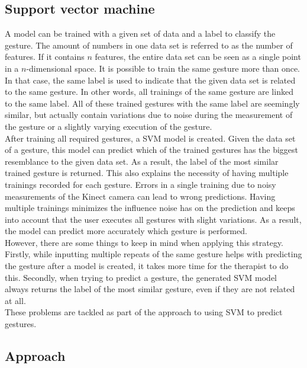 \subsection{Support vector machine}

A model can be trained with a given set of data and a label to classify the gesture. The amount of numbers in one data set is referred to as the number of features. If it contains $n$ features, the entire data set can be seen as a single point in a $n$-dimensional space. It is possible to train the same gesture more than once. In that case, the same label is used to indicate that the given data set is related to the same gesture. In other words, all trainings of the same gesture are linked to the same label. All of these trained gestures with the same label are seemingly similar, but actually contain variations due to noise during the measurement of the gesture or a slightly varying execution of the gesture.\\

After training all required gestures, a SVM model is created. Given the data set of a gesture, this model can predict which of the trained gestures has the biggest resemblance to the given data set. As a result, the label of the most similar trained gesture is returned. This also explains the necessity of having multiple trainings recorded for each gesture. Errors in a single training due to noisy measurements of the Kinect camera can lead to wrong predictions. Having multiple trainings minimizes the influence noise has on the prediction and keeps into account that the user executes all gestures with slight variations. As a result, the model can predict more accurately which gesture is performed.\\

However, there are some things to keep in mind when applying this strategy. Firstly, while inputting multiple repeats of the same gesture helps with predicting the gesture after a model is created, it takes more time for the therapist to do this. Secondly, when trying to predict a gesture, the generated SVM model always returns the label of the most similar gesture, even if they are not related at all.\\

These problems are tackled as part of the approach to using SVM to predict gestures.


\subsection{Approach}


